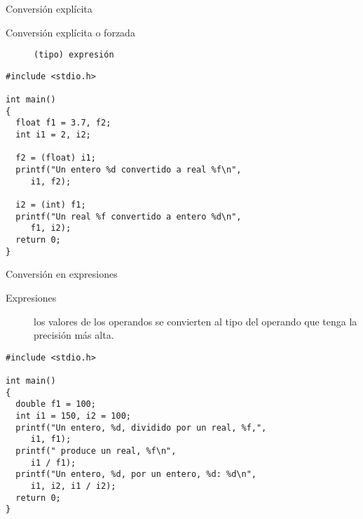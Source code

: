 \documentclass[xcolor={usenames,svgnames,dvipsnames}, aspectratio=169]{beamer}
\begin{document}
\begin{frame}[label={sec:org7ea5178},fragile]{Conversión explícita}
 \begin{description}
\item[{Conversión explícita o forzada}] \texttt{(tipo) expresión}
\end{description}
\lstset{language=C,label= ,caption= ,captionpos=b,numbers=none}
\begin{lstlisting}
#include <stdio.h>

int main()
{
  float f1 = 3.7, f2;
  int i1 = 2, i2;

  f2 = (float) i1;
  printf("Un entero %d convertido a real %f\n",
	 i1, f2);

  i2 = (int) f1;
  printf("Un real %f convertido a entero %d\n",
	 f1, i2);
  return 0;
}
\end{lstlisting}
\end{frame}

\begin{frame}[label={sec:org807bb19},fragile]{Conversión en expresiones}
 \begin{description}
\item[{Expresiones}] los valores de los operandos se convierten al tipo del operando que tenga la precisión más alta.
\end{description}

\lstset{language=C,label= ,caption= ,captionpos=b,numbers=none}
\begin{lstlisting}
#include <stdio.h>

int main()
{
  double f1 = 100;
  int i1 = 150, i2 = 100;
  printf("Un entero, %d, dividido por un real, %f,",
	 i1, f1);
  printf(" produce un real, %f\n",
	 i1 / f1);
  printf("Un entero, %d, por un entero, %d: %d\n",
	 i1, i2, i1 / i2);
  return 0;
}
\end{lstlisting}
\end{frame}
\end{document}
